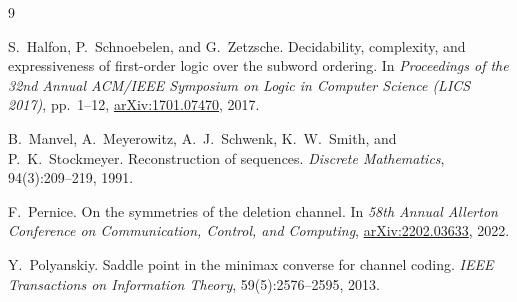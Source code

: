 \documentclass[11pt]{article}
\theoremstyle{plain}
\theoremstyle{definition}
\theoremstyle{remark}
\begin{document}
\begin{thebibliography}{9}

S.~Halfon, P.~Schnoebelen, and G.~Zetzsche.
Decidability, complexity, and expressiveness of first-order logic over the subword ordering.
In \emph{Proceedings of the 32nd Annual ACM/IEEE Symposium on Logic in Computer Science (LICS 2017)},
pp.~1--12, \href{https://arxiv.org/abs/1701.07470}{arXiv:1701.07470}, 2017.

B.~Manvel, A.~Meyerowitz, A.~J.~Schwenk, K.~W.~Smith, and P.~K.~Stockmeyer.
Reconstruction of sequences.
\emph{Discrete Mathematics}, 94(3):209--219, 1991.

F.~Pernice.
On the symmetries of the deletion channel.
In \emph{58th Annual Allerton Conference on Communication, Control, and Computing},
\href{https://arxiv.org/abs/2202.03633}{arXiv:2202.03633}, 2022.

Y.~Polyanskiy.
Saddle point in the minimax converse for channel coding.
\emph{IEEE Transactions on Information Theory}, 59(5):2576--2595, 2013.

\end{thebibliography}
\end{document}
